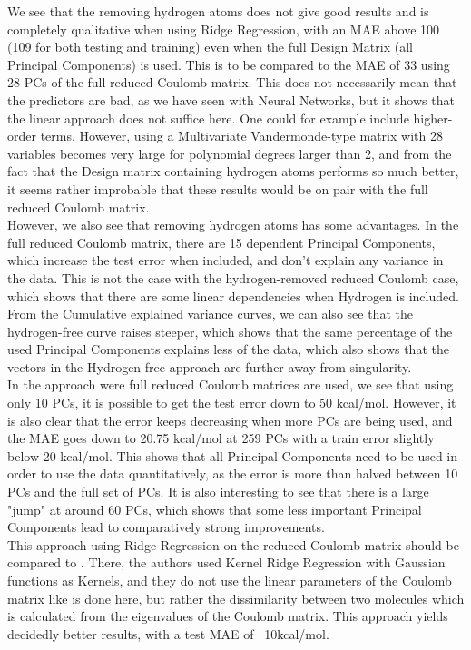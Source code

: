 \documentclass[11pt,a4paper,notitlepage]{article}
\begin{document}
We see that the removing hydrogen atoms does not give good results and is completely qualitative when using Ridge Regression, with an MAE above 100 (109 for both testing and training) even when the full Design Matrix (all Principal Components) is used. This is to be compared to the MAE of 33 using 28 PCs of the full reduced Coulomb matrix.  This does not necessarily mean that the predictors are bad, as we have seen with Neural Networks, but it shows that the linear approach does not suffice here. One could for example include higher-order terms. However, using a Multivariate Vandermonde-type matrix with 28 variables becomes very large for polynomial degrees larger than 2, and from the fact that the Design matrix containing hydrogen atoms performs so much better, it seems rather improbable that these results would be on pair with the full reduced Coulomb matrix. \\
However, we also see that removing hydrogen atoms has some advantages. In the full reduced Coulomb matrix, there are 15 dependent Principal Components, which increase the test error when included, and don't explain any variance in the data. This is not the case with the hydrogen-removed reduced Coulomb case, which shows that there are some linear dependencies when Hydrogen is included. From the Cumulative explained variance curves, we can also see that the hydrogen-free curve raises steeper, which shows that the same percentage of the used Principal Components explains less of the data, which also shows that the vectors in the Hydrogen-free approach are further away from singularity. \\
In the approach were full reduced Coulomb matrices are used, we see that using only 10 PCs, it is possible to get the test error down to 50 kcal/mol. However, it is also clear that the error keeps decreasing when more PCs are being used, and the MAE goes down to 20.75 kcal/mol at 259 PCs with a train error slightly below 20 kcal/mol. This shows that all Principal Components need to be used in order to use the data quantitatively, as the error is more than halved between 10 PCs and the full set of PCs. It is also interesting to see that there is a large "jump" at around 60 PCs, which shows that some less important Principal Components lead to comparatively strong improvements.\\

This approach using Ridge Regression on the reduced Coulomb matrix should be compared to \citep{Atomization_Ridge}. There, the authors used Kernel Ridge Regression with Gaussian functions as Kernels, and they do not use the linear parameters of the Coulomb matrix like is done here, but rather the dissimilarity between two molecules which is calculated from the eigenvalues of the Coulomb matrix. This approach yields decidedly better results, with a test MAE of ~10kcal/mol.
\end{document}
